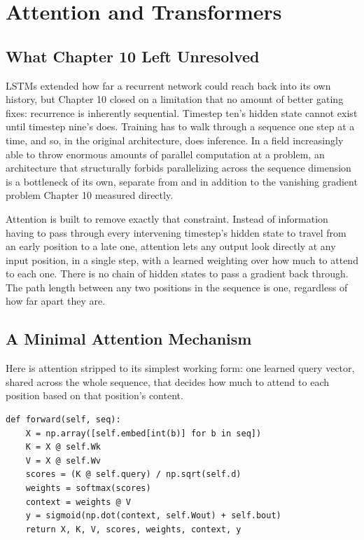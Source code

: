 \chapter{Attention and Transformers}

\section*{What Chapter 10 Left Unresolved}

LSTMs extended how far a recurrent network could reach back into its own history, but Chapter 10 closed on a limitation that no amount of better gating fixes: recurrence is inherently sequential. Timestep ten's hidden state cannot exist until timestep nine's does. Training has to walk through a sequence one step at a time, and so, in the original architecture, does inference. In a field increasingly able to throw enormous amounts of parallel computation at a problem, an architecture that structurally forbids parallelizing across the sequence dimension is a bottleneck of its own, separate from and in addition to the vanishing gradient problem Chapter 10 measured directly.

Attention is built to remove exactly that constraint. Instead of information having to pass through every intervening timestep's hidden state to travel from an early position to a late one, attention lets any output look directly at any input position, in a single step, with a learned weighting over how much to attend to each one. There is no chain of hidden states to pass a gradient back through. The path length between any two positions in the sequence is one, regardless of how far apart they are.

\section*{A Minimal Attention Mechanism}

Here is attention stripped to its simplest working form: one learned query vector, shared across the whole sequence, that decides how much to attend to each position based on that position's content.

\begin{Verbatim}[fontsize=\small, frame=single, xleftmargin=1em, xrightmargin=1em]
def forward(self, seq):
    X = np.array([self.embed[int(b)] for b in seq])
    K = X @ self.Wk
    V = X @ self.Wv
    scores = (K @ self.query) / np.sqrt(self.d)
    weights = softmax(scores)
    context = weights @ V
    y = sigmoid(np.dot(context, self.Wout) + self.bout)
    return X, K, V, scores, weights, context, y
\end{Verbatim}

